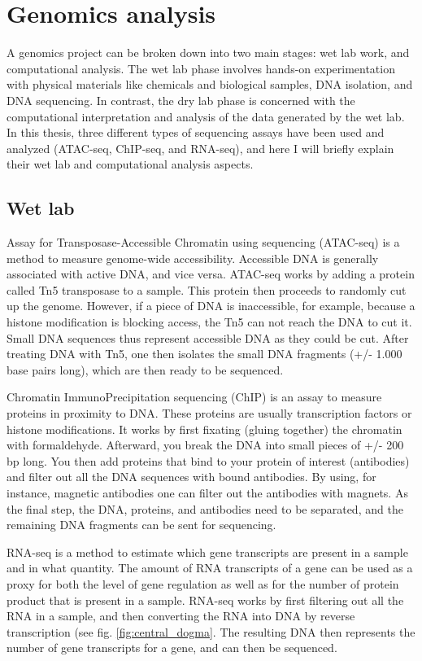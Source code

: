 \section{Genomics analysis}

A genomics project can be broken down into two main stages: wet lab work,  and computational analysis. The wet lab phase involves hands-on experimentation with physical materials like chemicals and biological samples, DNA isolation, and DNA sequencing. In contrast, the dry lab phase is concerned with the computational interpretation and analysis of the data generated by the wet lab.  In this thesis, three different types of sequencing assays have been used and analyzed (ATAC-seq, ChIP-seq, and RNA-seq), and here I will briefly explain their wet lab and computational analysis aspects. 

\subsection{Wet lab}

Assay for Transposase-Accessible Chromatin using sequencing (ATAC-seq) is a method to measure genome-wide accessibility\cite{Buenrostro_2015}. Accessible DNA is generally associated with active DNA, and vice versa. ATAC-seq works by adding a protein called Tn5 transposase to a sample. This protein then proceeds to randomly cut up the genome. However, if a piece of DNA is inaccessible, for example, because a histone modification is blocking access, the Tn5 can not reach the DNA to cut it. Small DNA sequences thus represent accessible DNA as they could be cut. After treating DNA with Tn5, one then isolates the small DNA fragments (+/- 1.000 base pairs long), which are then ready to be sequenced.

Chromatin ImmunoPrecipitation sequencing (ChIP) is an assay to measure proteins in proximity to DNA\cite{Robertson_2007}. These proteins are usually transcription factors or histone modifications. It works by first fixating (gluing together) the chromatin with formaldehyde. Afterward, you break the DNA into small pieces of +/- 200 bp long. You then add proteins that bind to your protein of interest (antibodies) and filter out all the DNA sequences with bound antibodies. By using, for instance, magnetic antibodies one can filter out the antibodies with magnets. As the final step, the DNA, proteins, and antibodies need to be separated, and the remaining DNA fragments can be sent for sequencing.

RNA-seq is a method to estimate which gene transcripts are present in a sample and in what quantity\cite{Nagalakshmi2008}. The amount of RNA transcripts of a gene can be used as a proxy for both the level of gene regulation as well as for the number of protein product that is present in a sample. RNA-seq works by first filtering out all the RNA in a sample, and then converting the RNA into DNA by reverse transcription (see fig. \ref{fig:central_dogma}. The resulting DNA then represents the number of gene transcripts for a gene, and can then be sequenced.

